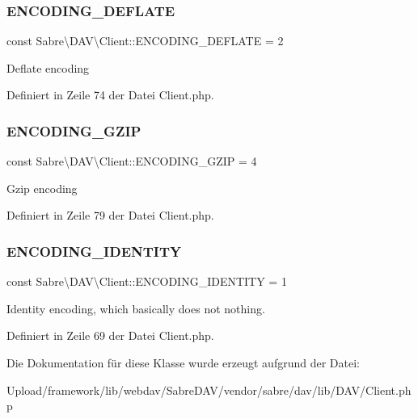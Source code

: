 \subsubsection{\texorpdfstring{E\+N\+C\+O\+D\+I\+N\+G\+\_\+\+D\+E\+F\+L\+A\+TE}{ENCODING\_DEFLATE}}
{\footnotesize\ttfamily const Sabre\textbackslash{}\+D\+A\+V\textbackslash{}\+Client\+::\+E\+N\+C\+O\+D\+I\+N\+G\+\_\+\+D\+E\+F\+L\+A\+TE = 2}

Deflate encoding 

Definiert in Zeile 74 der Datei Client.\+php.

\mbox{\label{class_sabre_1_1_d_a_v_1_1_client_a988e7881eea63d98221f1d99ccc75d51}} 
\subsubsection{\texorpdfstring{E\+N\+C\+O\+D\+I\+N\+G\+\_\+\+G\+Z\+IP}{ENCODING\_GZIP}}
{\footnotesize\ttfamily const Sabre\textbackslash{}\+D\+A\+V\textbackslash{}\+Client\+::\+E\+N\+C\+O\+D\+I\+N\+G\+\_\+\+G\+Z\+IP = 4}

Gzip encoding 

Definiert in Zeile 79 der Datei Client.\+php.

\mbox{\label{class_sabre_1_1_d_a_v_1_1_client_a46b7f1a329a3e8480fc3df2849fe9e63}} 
\subsubsection{\texorpdfstring{E\+N\+C\+O\+D\+I\+N\+G\+\_\+\+I\+D\+E\+N\+T\+I\+TY}{ENCODING\_IDENTITY}}
{\footnotesize\ttfamily const Sabre\textbackslash{}\+D\+A\+V\textbackslash{}\+Client\+::\+E\+N\+C\+O\+D\+I\+N\+G\+\_\+\+I\+D\+E\+N\+T\+I\+TY = 1}

Identity encoding, which basically does not nothing. 

Definiert in Zeile 69 der Datei Client.\+php.



Die Dokumentation für diese Klasse wurde erzeugt aufgrund der Datei\+:\begin{DoxyCompactItemize}
\item 
Upload/framework/lib/webdav/\+Sabre\+D\+A\+V/vendor/sabre/dav/lib/\+D\+A\+V/Client.\+php\end{DoxyCompactItemize}
